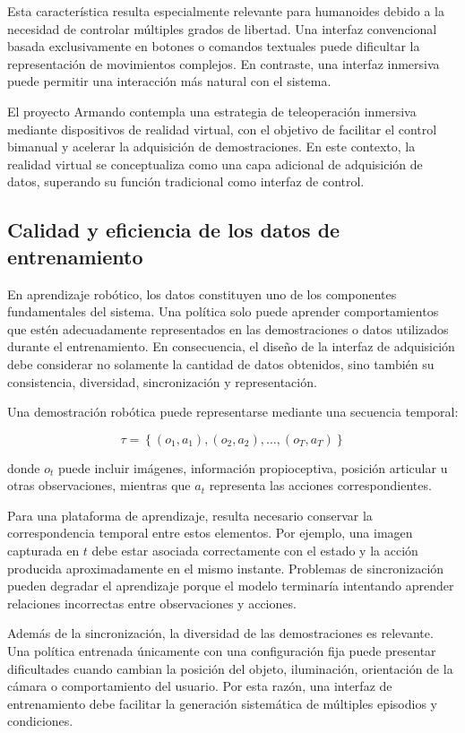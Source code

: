 \documentclass[stu,12pt,floatsintext]{apa7}
\begin{document}
Esta característica resulta especialmente relevante para humanoides debido a la necesidad de controlar múltiples grados de libertad. Una interfaz convencional basada exclusivamente en botones o comandos textuales puede dificultar la representación de movimientos complejos. En contraste, una interfaz inmersiva puede permitir una interacción más natural con el sistema.

El proyecto Armando contempla una estrategia de teleoperación inmersiva mediante dispositivos de realidad virtual, con el objetivo de facilitar el control bimanual y acelerar la adquisición de demostraciones. En este contexto, la realidad virtual se conceptualiza como una capa adicional de adquisición de datos, superando su función tradicional como interfaz de control.

\subsection{Calidad y eficiencia de los datos de entrenamiento}

En aprendizaje robótico, los datos constituyen uno de los componentes fundamentales del sistema. Una política solo puede aprender comportamientos que estén adecuadamente representados en las demostraciones o datos utilizados durante el entrenamiento. En consecuencia, el diseño de la interfaz de adquisición debe considerar no solamente la cantidad de datos obtenidos, sino también su consistencia, diversidad, sincronización y representación.

Una demostración robótica puede representarse mediante una secuencia temporal:

\begin{equation}
\tau = \left\{(o_1,a_1),(o_2,a_2),\ldots,(o_T,a_T)\right\}
\end{equation}

donde $o_t$ puede incluir imágenes, información propioceptiva, posición articular u otras observaciones, mientras que $a_t$ representa las acciones correspondientes.

Para una plataforma de aprendizaje, resulta necesario conservar la correspondencia temporal entre estos elementos. Por ejemplo, una imagen capturada en $t$ debe estar asociada correctamente con el estado y la acción producida aproximadamente en el mismo instante. Problemas de sincronización pueden degradar el aprendizaje porque el modelo terminaría intentando aprender relaciones incorrectas entre observaciones y acciones.

Además de la sincronización, la diversidad de las demostraciones es relevante. Una política entrenada únicamente con una configuración fija puede presentar dificultades cuando cambian la posición del objeto, iluminación, orientación de la cámara o comportamiento del usuario. Por esta razón, una interfaz de entrenamiento debe facilitar la generación sistemática de múltiples episodios y condiciones.
\end{document}
